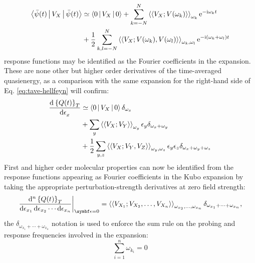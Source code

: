 \begin{equation}
\begin{aligned}
 \Braket{\bar{\psi}(t) | V_X | \bar{\psi}(t)} &\simeq
 \Braket{0|V_X|0} +\sum_{k=-N}^N
 \Braket{\Braket{V_X; V(\omega_k)}}_{\omega_k}\mathrm{e}^{-\mathrm{i}\omega_k t} \\
 &+\frac{1}{2}\sum_{k,l=-N}^N
 \Braket{\Braket{V_X; V(\omega_k),V(\omega_l)}}_{\omega_k,\omega_l}\mathrm{e}^{-\mathrm{i}(\omega_k+\omega_l)t}
\end{aligned}
\end{equation}
response functions may be identified as the Fourier coefficients in the
expansion. These are none other but higher order derivatives of the
time-averaged quasienergy, as a comparison with the same expansion for
the right-hand side of Eq. \eqref{eq:tave-hellfeyn} will confirm:
\begin{equation}\label{eq:kubo}
\begin{aligned}
  \frac{\mathop{}\!\mathrm{d}^{}\left\lbrace Q(t)\right\rbrace_T}{\mathop{}\!\mathrm{d} \epsilon_x^{}}
  &\simeq \Braket{0|V_X|0}\delta_{\omega_x} \\
  &+\sum_{y}\Braket{\Braket{V_X; V_Y}}_{\omega_y}\epsilon_y\delta_{\omega_x+\omega_y} \\
  &+\frac{1}{2}\sum_{y,z}\Braket{\Braket{V_X; V_Y,V_Z}}_{\omega_y,\omega_z}\epsilon_y\epsilon_z\delta_{\omega_x+\omega_y+\omega_z}
\end{aligned}
\end{equation}
First and higher order molecular properties can now be identified from
the response functions appearing as Fourier coefficients in the Kubo
expansion by taking the appropriate perturbation-strength derivatives at
zero field strength:
\begin{equation}\label{eq:nth-order-derivative}
  \left.\frac{\diff^n \aveQ}{\diff\epsilon_{x_1}\diff\epsilon_{x_2}\cdots\diff\epsilon_{x_n}} \right|_{\vect{\epsilon}=0}
  =
  \response{V_{X_1}}{V_{X_2}, \ldots, V_{X_n}}{\omega_{x_2},\ldots,\omega_{x_n}}\delta_{\omega_{x_1}+\cdots+\omega_{x_n}},
\end{equation}
the $\delta_{\omega_{x_1}+\cdots+\omega_{x_n}}$ notation is used to
enforce the sum rule on the probing and response frequencies involved in
the expansion:
\begin{equation}\label{eq:sum-rule}
 \sum_{i=1}^{n} \omega_{k_i} = 0
\end{equation}

